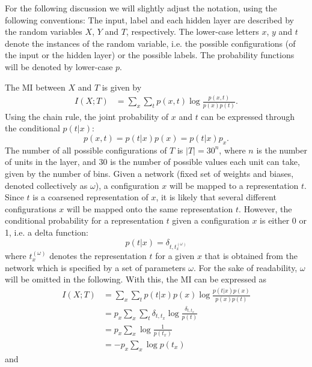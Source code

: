 \documentclass[12pt]{report}
\begin{document}
For the following discussion we will slightly adjust the notation, using the following conventions: The input, label and each hidden layer are described by the random variables $X$, $Y$ and $T$, respectively. The lower-case letters $x$, $y$ and $t$ denote the instances of the random variable, i.e. the possible configurations (of the input or the hidden layer) or the possible labels. The probability functions will be denoted by lower-case $p$.

The MI between $X$ and $T$ is given by
\begin{align}
I(X;T) &= \sum \limits_{x} \sum \limits_{t} p(x,t) \log\frac{p(x,t)}{p(x)p(t)}.
\end{align}
Using the chain rule, the joint probability of $x$ and $t$ can be expressed through the conditional $p(t|x)$:
\begin{equation}
p(x,t) = p(t|x)p(x) = p(t|x) p_x.
\end{equation}
The number of all possible configurations of $T$ is $|T| = 30^n$, where $n$ is the number of units in the layer, and 30 is the number of possible values each unit can take, given by the number of bins. Given a network (fixed set of weights and biases, denoted collectively as $\omega$), a configuration $x$ will be mapped to a representation $t$. Since $t$ is a coarsened representation of $x$, it is likely that several different configurations $x$ will be mapped onto the same representation $t$. However, the conditional probability for a representation $t$ given a configuration $x$ is either 0 or 1, i.e. a delta function:
\begin{equation}
p(t|x) = \delta_{t,t^{(\omega)}_x}
\end{equation}
where $t^{(\omega)}_x$ denotes the representation $t$ for a given $x$ that is obtained from the network which is specified by a set of parameters $\omega$. For the sake of readability, $\omega$ will be omitted in the following. With this, the MI can be expressed as
\begin{align}
I(X;T) &= \sum \limits_{x} \sum \limits_{t} p(t|x) p(x) \log\frac{p(t|x)p(x)}{p(x)p(t)}\\
   &= p_x \sum \limits_{x} \sum \limits_{t} \delta_{t,t_x} \log\frac{\delta_{t,t_x}}{p(t)}\\
   &= p_x \sum \limits_{x} \log\frac{1}{p(t_x)}\\
   &= - p_x \sum \limits_{x} \log p(t_x)   
\end{align}
and
\end{document}
